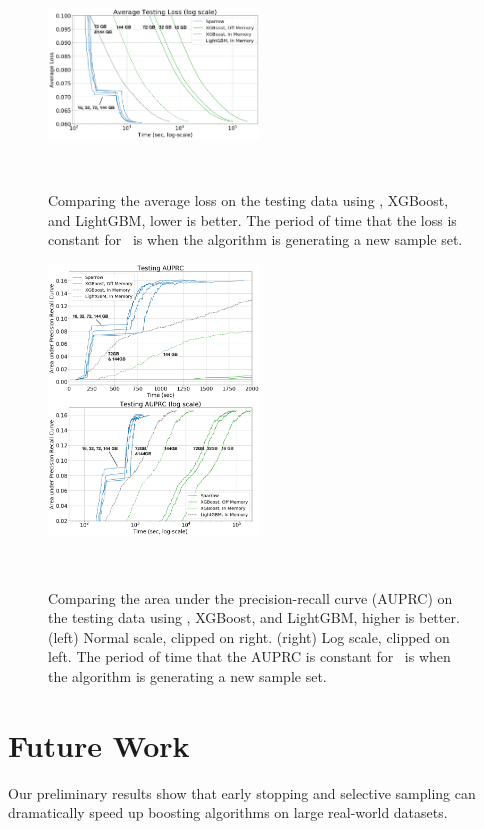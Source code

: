 \begin{figure}[t]
    \centering
    \includegraphics[width=0.5\textwidth]{figs/splice-loss2m.png}
    \caption{Comparing the average loss on the testing data using \Sparrow, XGBoost, and LightGBM, lower is better.
        The period of time that the loss is constant for \Sparrow\ is when the algorithm is generating a new sample set.}~\label{fig:loss}
\end{figure}

\begin{figure}[t]
    \centering
    \includegraphics[width=0.5\textwidth]{figs/splice-auprc2m.png}
    \caption{Comparing the area under the precision-recall curve (AUPRC) on the testing data
    using \Sparrow, XGBoost, and LightGBM, higher is better.
    (left) Normal scale, clipped on right.
    (right) Log scale, clipped on left.
    The period of time that the AUPRC is constant for \Sparrow\ is when the algorithm is generating a new sample set.}~\label{fig:auprc}
\end{figure}


\section{Future Work}\label{sec:Conclusion}
Our preliminary results show that early stopping and selective
sampling can dramatically speed up boosting algorithms on large
real-world datasets.

